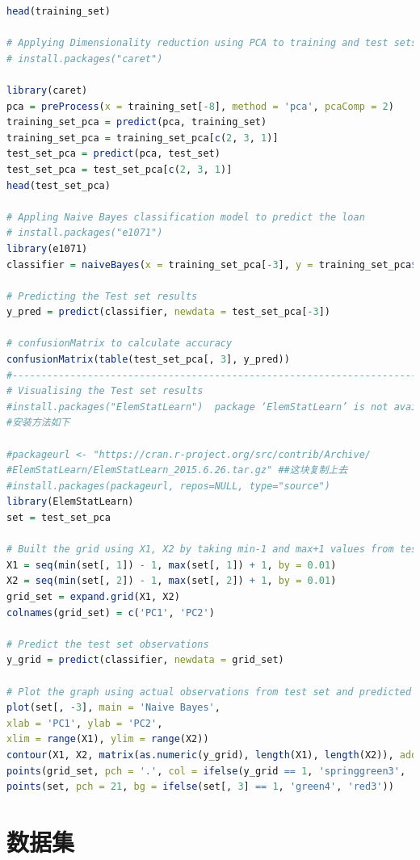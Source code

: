 \documentclass[UTF8]{ctexart}
\begin{document}
\begin{appendices}
\begin{lstlisting}[language=R]
head(training_set)

# Applying Dimensionality reduction using PCA to training and test sets
# install.packages("caret")

library(caret)
pca = preProcess(x = training_set[-8], method = 'pca', pcaComp = 2)
training_set_pca = predict(pca, training_set)
training_set_pca = training_set_pca[c(2, 3, 1)]
test_set_pca = predict(pca, test_set)
test_set_pca = test_set_pca[c(2, 3, 1)]
head(test_set_pca)

# Appling Naive Bayes classification model to predict the loan
# install.packages("e1071")
library(e1071)
classifier = naiveBayes(x = training_set_pca[-3], y = training_set_pca$loan_decision_status)

# Predicting the Test set results
y_pred = predict(classifier, newdata = test_set_pca[-3])

# confusionMatrix to calculate accuracy
confusionMatrix(table(test_set_pca[, 3], y_pred))
#--------------------------------------------------------------------------
# Visualising the Test set results
#install.packages("ElemStatLearn")  package ‘ElemStatLearn’ is not available (for R version 3.6.3)
#安装方法如下

#packageurl <- "https://cran.r-project.org/src/contrib/Archive/
#ElemStatLearn/ElemStatLearn_2015.6.26.tar.gz" ##这块复制上去
#install.packages(packageurl, repos=NULL, type="source")
library(ElemStatLearn)
set = test_set_pca

# Built the grid using X1, X2 by taking min-1 and max+1 values from test set
X1 = seq(min(set[, 1]) - 1, max(set[, 1]) + 1, by = 0.01)
X2 = seq(min(set[, 2]) - 1, max(set[, 2]) + 1, by = 0.01)
grid_set = expand.grid(X1, X2)
colnames(grid_set) = c('PC1', 'PC2')

# Predict the test set observations 
y_grid = predict(classifier, newdata = grid_set)

# Plot the graph using actual observations from test set and predicted results
plot(set[, -3], main = 'Naive Bayes',
xlab = 'PC1', ylab = 'PC2',
xlim = range(X1), ylim = range(X2))
contour(X1, X2, matrix(as.numeric(y_grid), length(X1), length(X2)), add = TRUE)
points(grid_set, pch = '.', col = ifelse(y_grid == 1, 'springgreen3', 'tomato'))
points(set, pch = 21, bg = ifelse(set[, 3] == 1, 'green4', 'red3')) 
\end{lstlisting}

\section{数据集}



\end{appendices}
	
\end{document}
